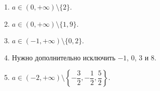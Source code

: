 \begin{notebox}
  \begin{enumerate}
    \item \(a\in(0,+\infty)\setminus\{2\}\).
    \item \(a\in(0,+\infty)\setminus\{1,9\}\).
    \item \(a\in(-1,+\infty)\setminus\{0,2\}\).
    \item Нужно дополнительно исключить \(-1\), \(0\), \(3\) и \(8\).
    \item \(a\in(-2,+\infty)\setminus
      \left\{-\dfrac32,-\dfrac12,\dfrac52\right\}\).
  \end{enumerate}
\end{notebox}
